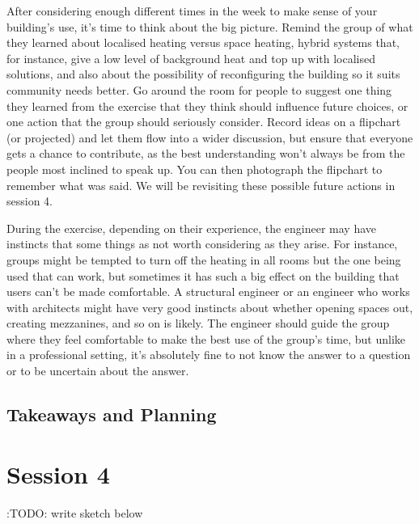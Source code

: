 \documentclass[letterpaper,10pt,english]{jupyterBook}
\begin{document}
\sphinxAtStartPar
After considering enough different times in the week to make sense of your building’s use, it’s time to think about the big picture.  Remind the group of what they learned about localised heating versus space heating, hybrid systems that, for instance, give a low level of background heat and top up with localised solutions, and also about the possibility of reconfiguring the building so it suits community needs better.  Go around the room for people to suggest one thing they learned from the exercise that they think should influence future choices, or one action that the group should seriously consider.  Record ideas on a flipchart (or projected) and let them flow into a wider discussion, but ensure that everyone gets a chance to contribute, as the best understanding won’t always be from the people most inclined to speak up.  You can then photograph the flipchart to remember what was said.  We will be revisiting these possible future actions in session 4.

\sphinxAtStartPar
During the exercise, depending on their experience, the engineer may have instincts that some things as not worth considering as they arise.  For instance, groups might be tempted to turn off the heating in all rooms but the one being used \sphinxhyphen{} that can work, but sometimes it has such a big effect on the building that users can’t be made comfortable.  A structural engineer or an engineer who works with architects might have very good instincts about whether opening spaces out, creating mezzanines, and so on is likely.  The engineer should guide the group where they feel comfortable to make the best use of the group’s time, but unlike in a professional setting, it’s absolutely fine to not know the answer to a question or to be uncertain about the answer.

\sphinxstepscope


\section{Takeaways and Planning}
\label{\detokenize{session3/details/takeaways-and-planning:takeaways-and-planning}}\label{\detokenize{session3/details/takeaways-and-planning::doc}}
\sphinxstepscope


\chapter{Session 4}
\label{\detokenize{session4/session4:session-4}}\label{\detokenize{session4/session4::doc}}
\sphinxAtStartPar
:TODO: write \sphinxhyphen{} sketch below
\end{document}
